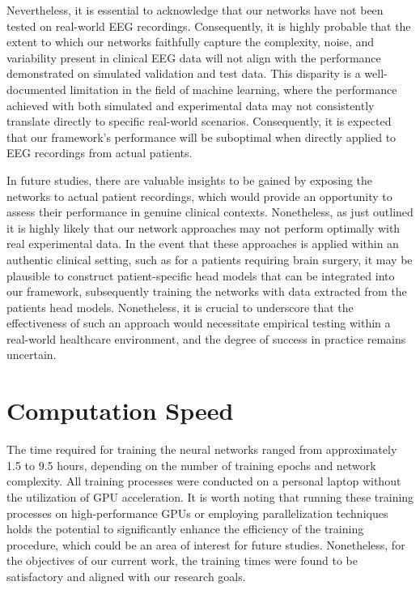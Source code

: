 \documentclass[a4paper, UKenglish, 11pt]{uiomaster}
\begin{document}
Nevertheless, it is essential to acknowledge that our networks have not been tested on real-world EEG recordings. Consequently, it is highly probable that the extent to which our networks faithfully capture the complexity, noise, and variability present in clinical EEG data will not align with the performance demonstrated on simulated validation and test data. This disparity is a well-documented limitation in the field of machine learning, where the performance achieved with both simulated and experimental data may not consistently translate directly to specific real-world scenarios. Consequently, it is expected that our framework's performance will be suboptimal when directly applied to EEG recordings from actual patients.

In future studies, there are valuable insights to be gained by exposing the networks to actual patient recordings, which would provide an opportunity to assess their performance in genuine clinical contexts. Nonetheless, as just outlined it is highly likely that our network approaches may not perform optimally with real experimental data. In the event that these approaches is applied within an authentic clinical setting, such as for a patients requiring brain surgery, it may be plausible to construct patient-specific head models that can be integrated into our framework, subsequently training the networks with data extracted from the patients head models. Nonetheless, it is crucial to underscore that the effectiveness of such an approach would necessitate empirical testing within a real-world healthcare environment, and the degree of success in practice remains uncertain.

\section{Computation Speed} \label{sec:time}
The time required for training the neural networks ranged from approximately 1.5 to 9.5 hours, depending on the number of training epochs and network complexity. All training processes were conducted on a personal laptop without the utilization of GPU acceleration. It is worth noting that running these training processes on high-performance GPUs or employing parallelization techniques holds the potential to significantly enhance the efficiency of the training procedure, which could be an area of interest for future studies. Nonetheless, for the objectives of our current work, the training times were found to be satisfactory and aligned with our research goals.
\end{document}
